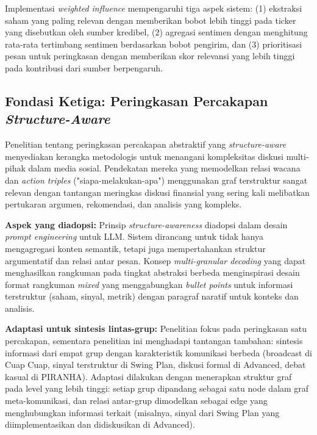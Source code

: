 Implementasi \textit{weighted influence} mempengaruhi tiga aspek sistem: (1) ekstraksi saham yang paling relevan dengan memberikan bobot lebih tinggi pada ticker yang disebutkan oleh sumber kredibel, (2) agregasi sentimen dengan menghitung rata-rata tertimbang sentimen berdasarkan bobot pengirim, dan (3) prioritisasi pesan untuk peringkasan dengan memberikan skor relevansi yang lebih tinggi pada kontribusi dari sumber berpengaruh.

\subsection{Fondasi Ketiga: Peringkasan Percakapan \textit{Structure-Aware}}

Penelitian \textcite{chen2021} tentang peringkasan percakapan abstraktif yang \textit{structure-aware} menyediakan kerangka metodologis untuk menangani kompleksitas diskusi multi-pihak dalam media sosial. Pendekatan mereka yang memodelkan relasi wacana dan \textit{action triples} ("siapa-melakukan-apa") menggunakan graf terstruktur sangat relevan dengan tantangan meringkas diskusi finansial yang sering kali melibatkan pertukaran argumen, rekomendasi, dan analisis yang kompleks.

\textbf{Aspek yang diadopsi:} Prinsip \textit{structure-awareness} diadopsi dalam desain \textit{prompt engineering} untuk LLM. Sistem dirancang untuk tidak hanya mengagregasi konten semantik, tetapi juga mempertahankan struktur argumentatif dan relasi antar pesan. Konsep \textit{multi-granular decoding} yang dapat menghasilkan rangkuman pada tingkat abstraksi berbeda menginspirasi desain format rangkuman \textit{mixed} yang menggabungkan \textit{bullet points} untuk informasi terstruktur (saham, sinyal, metrik) dengan paragraf naratif untuk konteks dan analisis.

\textbf{Adaptasi untuk sintesis lintas-grup:} Penelitian \textcite{chen2021} fokus pada peringkasan satu percakapan, sementara penelitian ini menghadapi tantangan tambahan: sintesis informasi dari empat grup dengan karakteristik komunikasi berbeda (broadcast di Cuap Cuap, sinyal terstruktur di Swing Plan, diskusi formal di Advanced, debat kasual di PIRANHA). Adaptasi dilakukan dengan menerapkan struktur graf pada level yang lebih tinggi: setiap grup dipandang sebagai satu node dalam graf meta-komunikasi, dan relasi antar-grup dimodelkan sebagai edge yang menghubungkan informasi terkait (misalnya, sinyal dari Swing Plan yang diimplementasikan dan didiskusikan di Advanced).

